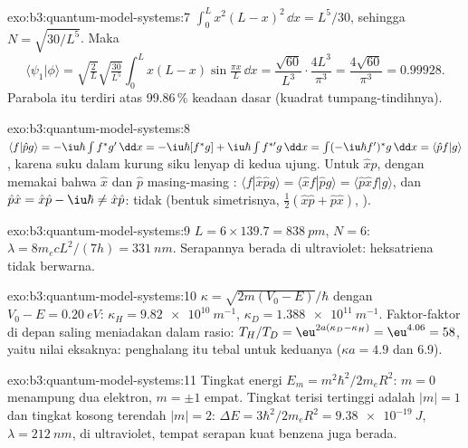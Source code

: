 \begin{solution}{exo:b3:quantum-model-systems:7}
$\int_0^Lx^2(L - x)^2\,\dd x = L^5/30$, sehingga $N = \sqrt{30/L^5}$. Maka
\[
\langle\psi_1|\phi\rangle = \sqrt{\tfrac2L}\sqrt{\tfrac{30}{L^5}}\int_0^Lx(L -
x)\sin\tfrac{\pi x}{L}\,\dd x = \frac{\sqrt{60}}{L^3}\cdot\frac{4L^3}{\pi^3} =
\frac{4\sqrt{60}}{\pi^3} = 0.99928 .
\]
Parabola itu terdiri atas 99.86\,\% keadaan dasar (kuadrat tumpang-tindihnya).
\end{solution}

\begin{solution}{exo:b3:quantum-model-systems:8}
$\langle f|\hat pg\rangle = -\iu\hbar\int f^*g'\,\dd x = -\iu\hbar[f^*g] +
\iu\hbar\int f^{*\prime}g\,\dd x = \int(-\iu\hbar f')^*g\,\dd x = \langle\hat
pf|g\rangle$, karena suku dalam kurung siku lenyap di kedua ujung. Untuk
$\hat x\hat p$, dengan memakai bahwa $\hat x$ dan $\hat p$ masing-masing
: $\langle f|\hat x\hat pg\rangle = \langle\hat xf|\hat pg\rangle = \langle\hat p\hat
xf|g\rangle$, dan $\hat p\hat x = \hat x\hat p - \iu\hbar \ne \hat x\hat p$: tidak
 (bentuk simetrisnya, $\frac12(\hat x\hat p + \hat p\hat x)$, ).
\end{solution}

\begin{solution}{exo:b3:quantum-model-systems:9}
$L = 6 \times 139.7 = \qty{838}{pm}$, $N = 6$: $\lambda = 8m_ecL^2/(7h) =
\qty{331}{nm}$. Serapannya berada di ultraviolet: heksatriena tidak berwarna.
\end{solution}

\begin{solution}{exo:b3:quantum-model-systems:10}
$\kappa = \sqrt{2m(V_0 - E)}/\hbar$ dengan $V_0 - E = \qty{0.20}{eV}$:
$\kappa_H = \qty{9.82e10}{m^{-1}}$, $\kappa_D = \qty{1.388e11}{m^{-1}}$.
Faktor-faktor di depan saling meniadakan dalam rasio: $T_H/T_D = \eu^{2a(\kappa_D - \kappa_H)} =
\eu^{4.06} = 58$, yaitu nilai eksaknya: penghalang itu tebal untuk keduanya
($\kappa a = 4.9$ dan 6.9).
\end{solution}

\begin{solution}{exo:b3:quantum-model-systems:11}
Tingkat energi $E_m = m^2\hbar^2/2m_eR^2$: $m = 0$ menampung dua elektron,
$m = \pm1$ empat. Tingkat terisi tertinggi adalah $|m| = 1$ dan tingkat kosong
terendah $|m| = 2$: $\Delta E =
3\hbar^2/2m_eR^2 = \qty{9.38e-19}{J}$,
$\lambda = \qty{212}{nm}$, di ultraviolet, tempat serapan kuat benzena juga
berada.
\end{solution}

